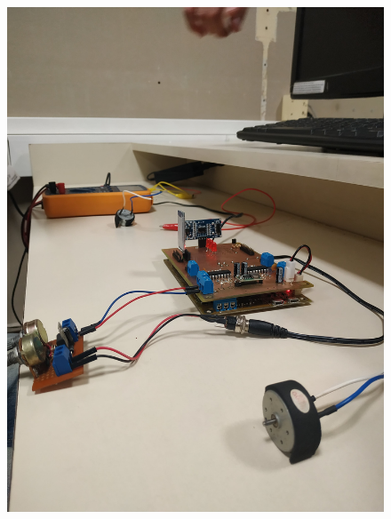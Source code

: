 \begin{figure}[H]
	\centering
	\includegraphics[width=1\linewidth]{imagenes/testing1.jpg}
	\label{fig:testing1}
\end{figure}

